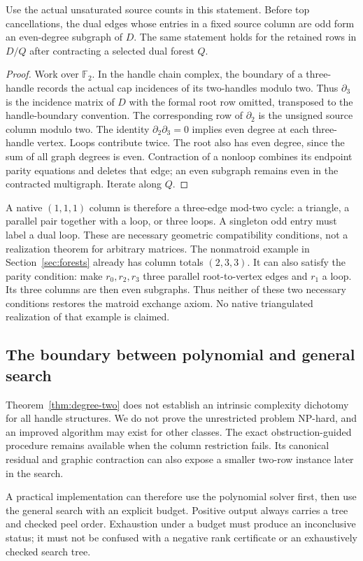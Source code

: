 \begin{proposition}
\label{prop:cycle}
Use the actual unsaturated source counts in this statement.  Before top
cancellations, the dual edges whose entries in a fixed source column are
odd form an even-degree subgraph of $D$.  The same statement
holds for the retained rows in $D/Q$ after contracting a selected dual
forest $Q$.
\end{proposition}
\begin{proof}
Work over $\mathbb F_2$.  In the handle chain complex, the boundary of
a three-handle records the actual cap incidences of its two-handles
modulo two.  Thus $\partial_3$ is the incidence matrix of $D$ with the
formal root row omitted, transposed to the handle-boundary convention.
The corresponding row of $\partial_2$ is the unsigned source column
modulo two.  The identity $\partial_2\partial_3=0$ implies even degree
at each three-handle vertex.  Loops contribute twice.  The root also
has even degree, since the sum of all graph degrees is even.  Contraction
of a nonloop combines its endpoint parity equations and deletes that
edge; an even subgraph remains even in the contracted multigraph.
Iterate along $Q$.
\end{proof}

A native $(1,1,1)$ column is therefore a three-edge mod-two cycle:
a triangle, a parallel pair together with a loop, or three loops.
A singleton odd entry must label a dual loop.  These are necessary
geometric compatibility conditions, not a realization theorem for arbitrary
matrices.  The nonmatroid example in Section~\ref{sec:forests} already
has column totals $(2,3,3)$.  It can also satisfy the parity condition:
make $r_0,r_2,r_3$ three parallel root-to-vertex edges and $r_1$ a loop.
Its three columns are then even subgraphs.  Thus neither of these two
necessary conditions restores the matroid exchange axiom.  No native
triangulated realization of that example is claimed.

\subsection{The boundary between polynomial and general search}
Theorem~\ref{thm:degree-two} does not establish an intrinsic complexity
dichotomy for all handle structures.  We do not prove the unrestricted
problem NP-hard, and an improved algorithm may exist for other classes.
The exact obstruction-guided procedure remains available when the column
restriction fails.  Its canonical residual and graphic contraction can
also expose a smaller two-row instance later in the search.

A practical implementation can therefore use the polynomial solver first,
then use the general search with an explicit budget.  Positive output
always carries a tree and checked peel order.  Exhaustion under a budget
must produce an inconclusive status; it must not be confused with a
negative rank certificate or an exhaustively checked search tree.
